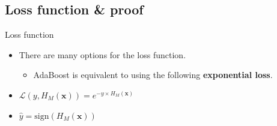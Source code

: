 \documentclass[serif, aspectratio=169]{beamer}
\begin{document}

\subsection{Loss function \& proof}

\begin{frame}{Loss function}
    \begin{itemize}
        \itemsep1em
        \justifying
        \item There are many options for the loss function.
        \begin{itemize}
            \item AdaBoost is equivalent to using the following \textbf{exponential loss}.
        \end{itemize}
        \item[] \begin{center}
            $\mathcal{L}(y,H_M(\boldsymbol{x}))=e^{-y \times H_M(\boldsymbol{x})}$
        \end{center}
        \item[] \begin{center}
            $\hat{y}=\text{sign}(H_M(\boldsymbol{x}))$
        \end{center}
    \end{itemize}
\end{frame}
\end{document}
